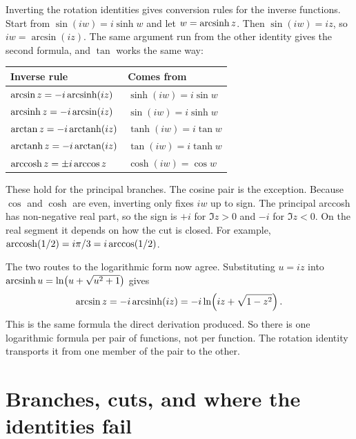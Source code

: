 \documentclass{essay}
\begin{document}
Inverting the rotation identities gives conversion rules for the inverse
functions. Start from $\sin(iw) = i \sinh w$ and let $w = \operatorname{arcsinh} z$. Then
$\sin(iw) = iz$, so $iw = \arcsin(iz)$. The same argument run from the other
identity gives the second formula, and $\tan$ works the same way:
\begin{center}
\begin{tabular}{ll}
\toprule
Inverse rule & Comes from \\
\midrule
$\arcsin z = -i \operatorname{arcsinh}(iz)$ & $\sinh(iw) = i \sin w$ \\
$\operatorname{arcsinh} z = -i \arcsin(iz)$ & $\sin(iw) = i \sinh w$ \\
$\arctan z = -i \operatorname{arctanh}(iz)$ & $\tanh(iw) = i \tan w$ \\
$\operatorname{arctanh} z = -i \arctan(iz)$ & $\tan(iw) = i \tanh w$ \\
$\operatorname{arccosh} z = \pm i \arccos z$ & $\cosh(iw) = \cos w$ \\
\bottomrule
\end{tabular}
\end{center}
These hold for the principal branches. The cosine pair is the exception.
Because $\cos$ and $\cosh$ are even, inverting only fixes $iw$ up to sign. The
principal arccosh has non-negative real part, so the sign is $+i$ for
$\Im z > 0$ and $-i$ for $\Im z < 0$. On the real segment it depends on how
the cut is closed. For example, $\operatorname{arccosh}(1/2) = i\pi/3 = i \arccos(1/2)$.

The two routes to the logarithmic form now agree. Substituting $u = iz$ into
$\operatorname{arcsinh} u = \ln\bigl(u + \sqrt{u^2 + 1}\bigr)$ gives
\[
  \arcsin z = -i \operatorname{arcsinh}(iz) = -i \ln\!\left( iz + \sqrt{1 - z^2} \right).
\]
This is the same formula the direct derivation produced. So there is one
logarithmic formula per pair of functions, not per function. The rotation
identity transports it from one member of the pair to the other.

\section{Branches, cuts, and where the identities fail}
\end{document}
